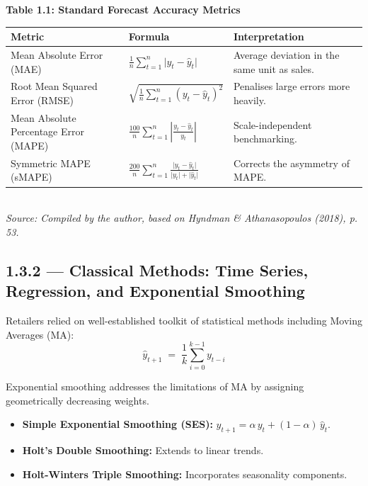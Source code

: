 \documentclass[12pt,a4paper,oneside]{report}
\begin{document}
\begin{table}[h!]
\centering
{\bfseries Table 1.1: Standard Forecast Accuracy Metrics}\\[6pt]
\renewcommand{\arraystretch}{1.8}
\begin{tabular}{p{3.6cm} p{5.2cm} p{5.5cm}}
\toprule
\textbf{Metric} & \textbf{Formula} & \textbf{Interpretation} \\
\midrule
Mean Absolute Error (MAE)
  & $\displaystyle\frac{1}{n}\sum_{t=1}^{n}\lvert y_t - \hat{y}_t\rvert$
  & Average deviation in the same unit as sales. \\[6pt]
Root Mean Squared Error (RMSE)
  & $\displaystyle\sqrt{\frac{1}{n}\sum_{t=1}^{n}(y_t-\hat{y}_t)^{2}}$
  & Penalises large errors more heavily. \\[6pt]
Mean Absolute Percentage Error (MAPE)
  & $\displaystyle\frac{100}{n}\sum_{t=1}^{n} \left\lvert\frac{y_t-\hat{y}_t}{y_t}\right\rvert$
  & Scale-independent benchmarking. \\[6pt]
Symmetric MAPE (sMAPE)
  & $\displaystyle\frac{200}{n}\sum_{t=1}^{n} \frac{\lvert y_t-\hat{y}_t\rvert}{\lvert y_t\rvert+\lvert\hat{y}_t\rvert}$
  & Corrects the asymmetry of MAPE. \\
\bottomrule
\end{tabular}\\[5pt]
{\small\textit{Source: Compiled by the author, based on Hyndman \& Athanasopoulos (2018), p. 53.}}
\end{table}

\subsection{1.3.2 — Classical Methods: Time Series, Regression, and Exponential Smoothing}
\label{subsec:1.3.2}

Retailers relied on well-established toolkit of statistical methods including Moving Averages (MA):
\begin{equation}
  \hat{y}_{t+1} \;=\; \frac{1}{k}\sum_{i=0}^{k-1} y_{t-i}
  \label{eq:ma}
\end{equation}

Exponential smoothing addresses the limitations of MA by assigning geometrically decreasing weights. 
\begin{itemize}
    \item \textbf{Simple Exponential Smoothing (SES):} $\hat{y}_{t+1} = \alpha\,y_t + (1-\alpha)\,\hat{y}_t$.
    \item \textbf{Holt's Double Smoothing:} Extends to linear trends.
    \item \textbf{Holt-Winters Triple Smoothing:} Incorporates seasonality components.
\end{itemize}
\end{document}
